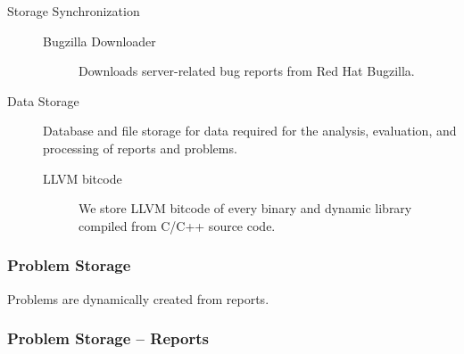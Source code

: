 \documentclass{article}
\begin{document}
\begin{description}
\item[Storage Synchronization]
  \begin{description}
  \item[Bugzilla Downloader] Downloads server-related bug reports from
    Red Hat Bugzilla.
  \end{description}
\item[Data Storage] Database and file storage for data required for
  the analysis, evaluation, and processing of reports and problems.
  \begin{description}
  \item[LLVM bitcode] We store LLVM bitcode of every binary and
    dynamic library compiled from C/C++ source code.
  \end{description}
\end{description}

\subsubsection{Problem Storage}
\begin{center}
\end{center}

Problems are dynamically created from reports.

\vfill
\subsubsection{Problem Storage -- Reports}
\end{document}

